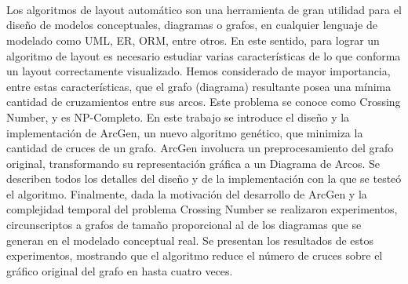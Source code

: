 \ \\
\ \\
\label{pagsumm}
\\
\ \\
\ \\

\ \\

\ \\
\ \\

Los algoritmos de layout automático son una herramienta de gran utilidad para el diseño de modelos conceptuales, diagramas o grafos, en cualquier lenguaje de modelado como UML, ER, ORM, entre otros. En este sentido, para lograr un algoritmo de layout es necesario estudiar varias características de lo que conforma un layout correctamente visualizado. Hemos considerado de mayor importancia, entre estas características, que el grafo (diagrama) resultante posea una mínima cantidad de cruzamientos entre sus arcos. Este problema se conoce como Crossing Number, y es NP-Completo. En este trabajo se introduce el diseño y la implementación de  {\sc ArcGen}, un nuevo algoritmo genético,  que minimiza la cantidad de cruces de un grafo. {\sc ArcGen} involucra  un preprocesamiento del  grafo  original,  transformando su representación gráfica a un Diagrama de Arcos. Se describen todos los detalles del diseño y de la  implementación con la que se testeó el  algoritmo.  Finalmente, dada la  motivación del desarrollo de  {\sc ArcGen}  y la complejidad temporal del problema Crossing Number se realizaron experimentos, circunscriptos a grafos de tamaño proporcional al de los diagramas que se generan en el modelado conceptual  real. Se presentan los resultados de estos experimentos, mostrando que el algoritmo reduce el número de cruces sobre el gráfico original del grafo en hasta cuatro veces.


\vfill
\pagebreak

